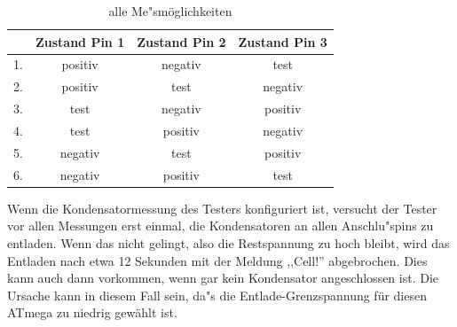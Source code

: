 \begin{table}[H]
  \begin{center}
    \begin{tabular}{| l | c | c | c |}
    \hline
      & Zustand Pin 1 & Zustand Pin 2 & Zustand Pin 3 \\
    \hline
   1. & positiv    &  negativ   &  test \\
   2. & positiv    &  test      & negativ \\
   3. & test       &  negativ   & positiv \\
   4. & test       &  positiv   & negativ \\
   5. & negativ    &  test      & positiv \\
   6. & negativ    &  positiv   &  test  \\
    \hline
    \end{tabular}
  \end{center}
  \caption{alle Me"sm\"oglichkeiten}
  \label{tab:case} 
\end{table}

Wenn die Kondensatormessung des Testers konfiguriert ist, versucht der Tester vor allen Messungen erst einmal,
die Kondensatoren an allen Anschlu"spins zu entladen. Wenn das nicht gelingt, also die Restspannung zu hoch bleibt,
wird das Entladen nach etwa 12 Sekunden mit der Meldung ,,Cell!'' abgebrochen. Dies kann auch dann vorkommen, wenn
gar kein Kondensator angeschlossen ist. Die Ursache kann in diesem Fall sein, da"s die Entlade-Grenzspannung f\"ur diesen
ATmega zu niedrig gew\"ahlt ist.
